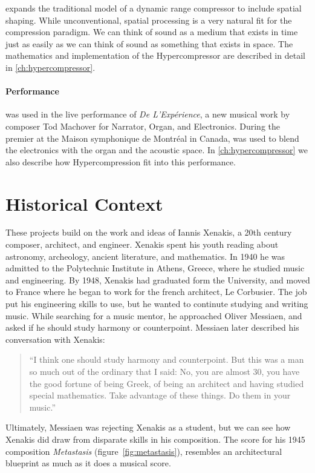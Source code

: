\thesis expands the traditional model of a dynamic range compressor to
include spatial shaping. While unconventional, spatial
processing is a very natural fit for the compression paradigm. We can
think of sound as a medium that exists in time just as easily as we
can think of sound as something that exists in
space. The mathematics and implementation of the
Hypercompressor are described in detail in \autoref{ch:hypercompressor}.

\paragraph{Performance}
\thesis was used in the live performance of \textit{De
  L'Exp\'{e}rience}, a new musical work by composer Tod Machover for
Narrator, Organ, and Electronics. During the premier at the Maison
symphonique de Montr\'{e}al in Canada, \thesis was used to blend the
electronics with the organ and the acoustic space. In
\autoref{ch:hypercompressor} we also describe how Hypercompression fit
into this performance.

\section{Historical Context}
\label{sec:context}
These projects build on the work and ideas of Iannis Xenakis, a 20th
century composer, architect, and engineer. Xenakis spent his youth
reading about astronomy, archeology, ancient literature, and
mathematics.\cite[]{Hoffmann2015} In 1940 he was admitted to the
Polytechnic Institute in Athens, Greece, where he studied music and
engineering. By 1948, Xenakis had graduated form the University, and
moved to France where he began to work for the french architect, Le
Corbusier. The job put his engineering skills to use, but he wanted to
continute studying and writing music.  While searching for a music
mentor, he approached Oliver Messiaen, and asked if he should study
harmony or counterpoint. Messiaen later described his conversation
with Xenakis:
\begin{quotation}``I think one should study harmony and
  counterpoint. But this was a man so much out of the ordinary that I
  said: No, you are almost 30, you have the good fortune of being
  Greek, of being an architect and having studied special
  mathematics. Take advantage of these things. Do them in your
  music.''\cite{Service2013}
\end{quotation}
Ultimately, Messiaen was rejecting Xenakis as a student, but we can
see how Xenakis did draw from disparate skills in his composition. The
score for his 1945 composition \textit{Metastasis}
(figure~\ref{fig:metastasis}), resembles an architectural blueprint as
much as it does a musical score.

